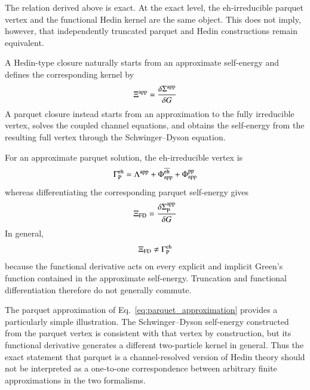 \documentclass[aip,jcp,reprint,noshowkeys,superscriptaddress]{revtex4-1}
\newcommand{\eh}{\text{eh}}
\newcommand{\teh}{\overline{\text{eh}}}
\newcommand{\pp}{\text{pp}}
\begin{document}
The relation derived above is exact.\cite{KuglerVonDelft2018}
At the exact level, the $\eh$-irreducible parquet vertex and the
functional Hedin kernel are the same object.
This does not imply, however, that independently truncated parquet and
Hedin constructions remain equivalent.\cite{KuglerVonDelft2018,Baym_1961,Baym_1962}

A Hedin-type closure naturally starts from an approximate self-energy and
defines the corresponding kernel by
\begin{equation}
	\Xi^{\rm app}
	=
	\frac{\delta\Sigma^{\rm app}}{\delta G}
	\label{eq:Hedin_closure}
\end{equation}
A parquet closure instead starts from an approximation to the fully
irreducible vertex, solves the coupled channel equations, and obtains the
self-energy from the resulting full vertex through the
Schwinger--Dyson equation.

For an approximate parquet solution, the $\eh$-irreducible vertex is
\begin{equation}
	\Gamma^\eh_{\rm P}
	=
	\Lambda^{\rm app}
	+
	\Phi^{\teh}_{\rm app}
	+
	\Phi^\pp_{\rm app}
	\label{eq:Gamma_parquet_approx}
\end{equation}
whereas differentiating the corresponding parquet self-energy gives
\begin{equation}
	\Xi_{\rm FD}
	=
	\frac{\delta\Sigma^{\rm app}_{\rm P}}{\delta G}
	\label{eq:Xi_functional_derivative}
\end{equation}
In general,
\begin{equation}
	\Xi_{\rm FD}
	\neq
	\Gamma^\eh_{\rm P}
	\label{eq:approx_mismatch}
\end{equation}
because the functional derivative acts on every explicit and implicit
Green's function contained in the approximate self-energy.
Truncation and functional differentiation therefore do not generally
commute.

The parquet approximation of Eq.~\eqref{eq:parquet_approximation} provides a
particularly simple illustration.
The Schwinger--Dyson self-energy constructed from the parquet vertex is
consistent with that vertex by construction, but its functional
derivative generates a different two-particle kernel in general.\cite{KuglerVonDelft2018}
Thus the exact statement that parquet is a channel-resolved version of
Hedin theory should not be interpreted as a one-to-one correspondence
between arbitrary finite approximations in the two formalisms.


\end{document}
